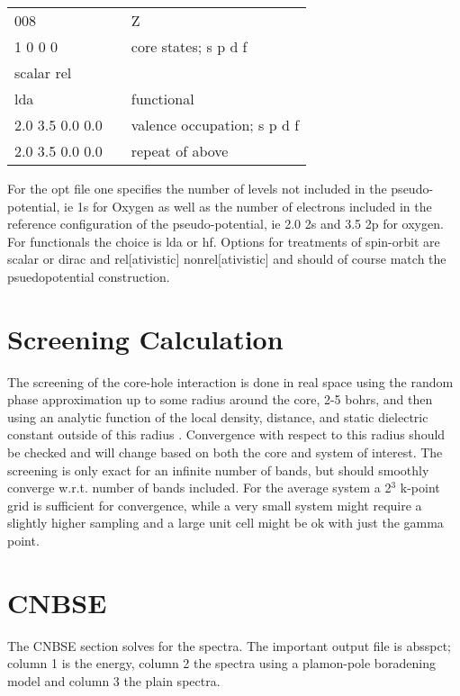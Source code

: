 \documentclass[11pt]{report}
\begin{document}
\begin{center}
\begin{tabular}{| l | c l |}
\hline
008				& &  Z\\
1 0 0 0			& & core states; s p d f \\
scalar rel			& & \\
lda				& & functional \\
2.0 3.5 0.0 0.0		& & valence occupation; s p d f \\
2.0 3.5 0.0 0.0		& & repeat of above \\
\hline
\end{tabular}
\end{center}

For the opt file one specifies the number of levels not included in the pseudo-potential, ie 1s for Oxygen as well as the number of electrons included in the reference configuration of the pseudo-potential, ie 2.0 2s and 3.5 2p for oxygen. For functionals the choice is lda or hf. Options for treatments of spin-orbit are 
scalar or dirac and rel[ativistic] nonrel[ativistic] and should of course match the psuedopotential 
construction. 

\chapter{Screening Calculation}
\label{screening}

The screening of the core-hole interaction is done in real space using the random phase approximation up to 
some radius around the core, 2-5 bohrs, and then using an analytic function of the local density, distance, 
and static dielectric constant outside of this radius \cite{screening}. Convergence with respect to this radius should be 
checked and will change based on both the core and system of interest. The screening is only exact for an 
infinite number of bands, but should smoothly converge w.r.t. number of bands included. For the average 
system a 2$^3$ k-point grid is sufficient for convergence, while a very small system might require a 
slightly higher sampling and a large unit cell might be ok with just the gamma point.

\chapter{ CNBSE }
The CNBSE section solves for the spectra. The important output file is absspct; column 1 is the energy, 
column 2 the spectra using a plamon-pole boradening model and column 3 the plain spectra.
\end{document}
